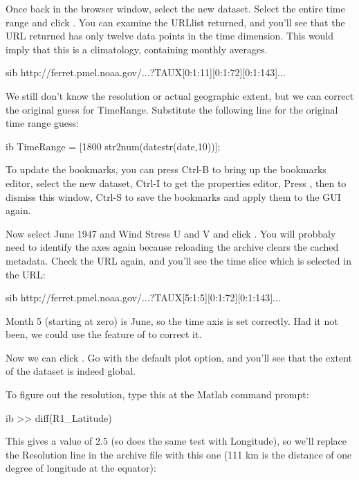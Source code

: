 Once back in the browser window, select the new dataset.  Select the
entire time range and click .  You can examine the
URLlist returned, and you'll see that the URL returned has only twelve
data points in the time dimension.  This would imply that this is a
climatology, containing monthly averages.

\begin{vcode}{sib}
http://ferret.pmel.noaa.gov/...?TAUX[0:1:11][0:1:72][0:1:143]...
\end{vcode}

We still don't know the resolution or actual geographic extent,
but we can correct the original guess for TimeRange.  Substitute the
following line for the original time range guess: 

\begin{vcode}{ib}
TimeRange = [1800 str2num(datestr(date,10))];
\end{vcode}

To update the bookmarks, you can press Ctrl-B to bring up the
bookmarks editor, select the new dataset, Ctrl-I to get the properties
editor, Press , then  to dismiss this
window, Ctrl-S to save the bookmarks and apply them to the GUI again.

Now select June 1947 and Wind Stress U and V and click .  You will probbaly need to identify the axes again because
reloading the archive clears the cached metadata.  Check the URL
again, and you'll see the time slice which is selected in the
URL:

\begin{vcode}{sib}
http://ferret.pmel.noaa.gov/...?TAUX[5:1:5][0:1:72][0:1:143]...
\end{vcode}

Month 5 (starting at zero) is June, so the time axis is set
correctly.  Had it not been, we could use the 
feature of  to correct it.

Now we can click .  Go with the default plot option, and
you'll see that the extent of the dataset is indeed global.

To figure out the resolution, type this at the Matlab command prompt:

\begin{vcode}{ib}
>> diff(R1_Latitude)
\end{vcode}

This gives a value of 2.5 (so does the same test with Longitude), so
we'll replace the Resolution line in the archive file with this one
(111 km is the distance of one degree of longitude at the equator):

